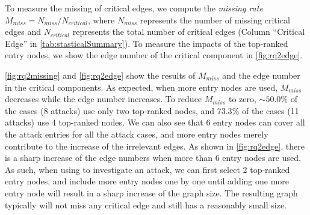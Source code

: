 

To measure the missing of critical edges, we compute the \emph{missing rate} $M_{miss} = N_{miss} / N_{critical}$, where $N_{miss}$ represents the number of missing critical edges and $N_{critical}$ represents the total number of critical edges (Column ``Critical Edge'' in \cref{tab:stasticalSummary}).
To measure the impacts of the top-ranked entry nodes, we show the edge number of the critical component \tool in \cref{fig:rq2edge}.



\cref{fig:rq2missing} and \cref{fig:rq2edge} show the results of $M_{miss}$ and the edge number in the critical components.
As expected, when more entry nodes are used, $M_{miss}$ decreases while the edge number increases.
To reduce $M_{miss}$ to zero, $\sim50.0\%$ of the cases (8 attacks) use only two top-ranked nodes, and $73.3\%$ of the cases (11 attacks) use 4 top-ranked nodes.
We can also see that 6 entry nodes can cover all the attack entries for all the attack cases, and more entry nodes merely contribute to the increase of the irrelevant edges.
As shown in \cref{fig:rq2edge}, there is a sharp increase of the edge numbers when more than 6 entry nodes are used.
As such, when using \tool to investigate an attack, we can first select 2 top-ranked entry nodes, and include more entry nodes one by one until adding one more entry node will result in a sharp increase of the graph size.
The resulting graph typically will not miss any critical edge and still has a reasonably small size.  




